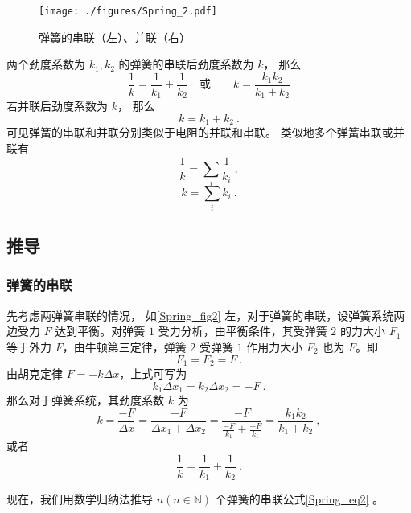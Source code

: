

\begin{figure}[ht]
\centering
\texttt{[image: ./figures/Spring\_2.pdf]}
\caption{弹簧的串联（左）、并联（右）} \label{Spring_fig2}
\end{figure}
两个劲度系数为 $k_1, k_2$ 的弹簧的串联后劲度系数为 $k$， 那么
\begin{equation}
\frac{1}{k} = \frac{1}{k_1} + \frac{1}{k_2}
\quad \text{或} \qquad
k = \frac{k_1 k_2}{k_1 + k_2}
\end{equation}
若并联后劲度系数为 $k$， 那么
\begin{equation}
k = k_1 + k_2~.
\end{equation}
可见弹簧的串联和并联分别类似于电阻的并联和串联。 类似地多个弹簧串联或并联有
\begin{equation}\label{Spring_eq2}
\frac{1}{k} = \sum_i \frac{1}{k_i}~,
\end{equation}
\begin{equation}\label{Spring_eq3}
k = \sum_i k_i~.
\end{equation}

\subsection{推导}
\subsubsection{弹簧的串联}
先考虑两弹簧串联的情况，
如\autoref{Spring_fig2} 左，对于弹簧的串联，设弹簧系统两边受力 $F$ 达到平衡。对弹簧 $1$ 受力分析，由平衡条件，其受弹簧 $2$ 的力大小 $F_1$ 等于外力 $F$，由牛顿第三定律，弹簧 $2$ 受弹簧 $1$ 作用力大小 $F_2$ 也为 $F$。即
\begin{equation}
F_1=F_2=F~.
\end{equation}
由胡克定律 $F=-k\Delta x$，上式可写为
\begin{equation}
k_1\Delta x_1=k_2\Delta x_2=-F~.
\end{equation}
那么对于弹簧系统，其劲度系数 $k$ 为
\begin{equation}
k=\frac{-F}{\Delta x}=\frac{-F}{\Delta x_1+\Delta x_2}=\frac{-F}{\frac{-F}{k_1}+\frac{-F}{k_1}}=\frac{k_1k_2}{k_1+k_2}~,
\end{equation}
或者
\begin{equation}
\frac{1}{k}=\frac{1}{k_1}+\frac{1}{k_2}~.
\end{equation}

现在，我们用数学归纳法推导 $n(n\in \mathbb N)$ 个弹簧的串联公式\autoref{Spring_eq2} 。

